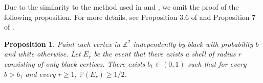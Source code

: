 \documentclass{article}
\renewcommand{\P}{\mathbb{P}}
\newcommand{\N}{\mathbb{N}}
\newcommand{\bZ}{{\mathbb Z}}
\numberwithin{equation}{section}
\newtheorem{lemma}[theorem]{Lemma}
\newtheorem{prop}[theorem]{Proposition}
\begin{document}


Due to the similarity to the method used in \cite{GS2020} and \cite{GravnerHolroydSivakoff}, we omit the proof of the following proposition.
For more details, see Proposition 3.6 of \cite{GS2020} and Proposition 7 of \cite{GravnerHolroydSivakoff}.

\begin{prop}
\label{prop:shellsatisfiesproperties}
    Paint each vertex in $\bZ^2$ independently by black with probability $b$ and white otherwise.
    Let $E_r$ be the event that
    there exists a shell of radius $r$ consisting of only black vertices. 
    There exists $b_1 \in (0, 1)$ such that for every $b > b_1$ and every $r \geq 1$, $\P(E_r) \geq 1/2$.
\end{prop}


\end{document}
